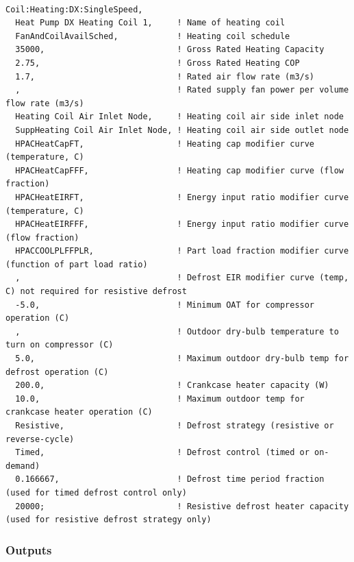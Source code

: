 \begin{lstlisting}

Coil:Heating:DX:SingleSpeed,
  Heat Pump DX Heating Coil 1,     ! Name of heating coil
  FanAndCoilAvailSched,            ! Heating coil schedule
  35000,                           ! Gross Rated Heating Capacity
  2.75,                            ! Gross Rated Heating COP
  1.7,                             ! Rated air flow rate (m3/s)
  ,                                ! Rated supply fan power per volume flow rate (m3/s)
  Heating Coil Air Inlet Node,     ! Heating coil air side inlet node
  SuppHeating Coil Air Inlet Node, ! Heating coil air side outlet node
  HPACHeatCapFT,                   ! Heating cap modifier curve (temperature, C)
  HPACHeatCapFFF,                  ! Heating cap modifier curve (flow fraction)
  HPACHeatEIRFT,                   ! Energy input ratio modifier curve (temperature, C)
  HPACHeatEIRFFF,                  ! Energy input ratio modifier curve (flow fraction)
  HPACCOOLPLFFPLR,                 ! Part load fraction modifier curve (function of part load ratio)
  ,                                ! Defrost EIR modifier curve (temp, C) not required for resistive defrost
  -5.0,                            ! Minimum OAT for compressor operation (C)
  ,                                ! Outdoor dry-bulb temperature to turn on compressor (C)
  5.0,                             ! Maximum outdoor dry-bulb temp for defrost operation (C)
  200.0,                           ! Crankcase heater capacity (W)
  10.0,                            ! Maximum outdoor temp for crankcase heater operation (C)
  Resistive,                       ! Defrost strategy (resistive or reverse-cycle)
  Timed,                           ! Defrost control (timed or on-demand)
  0.166667,                        ! Defrost time period fraction (used for timed defrost control only)
  20000;                           ! Resistive defrost heater capacity (used for resistive defrost strategy only)
\end{lstlisting}

\subsubsection{Outputs}\label{outputs-15-000}


